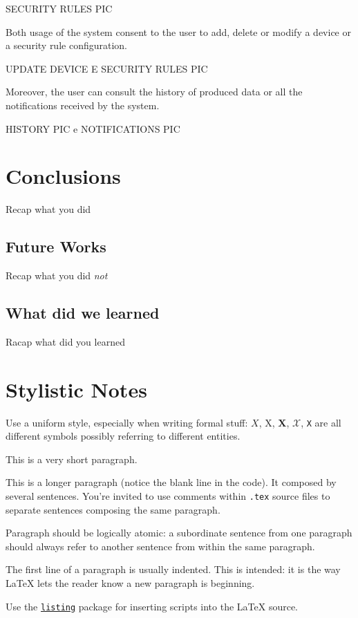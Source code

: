\documentclass{scrartcl}
\begin{document}
    SECURITY RULES PIC

    Both usage of the system consent to the user to add, delete or modify a device or a security rule configuration.

    UPDATE DEVICE E SECURITY RULES PIC

    Moreover, the user can consult the history of produced data or all the notifications received by the system.

    HISTORY PIC e NOTIFICATIONS PIC


    \section{Conclusions}

    Recap what you did

    \subsection{Future Works}

    Recap what you did \emph{not}

    \subsection{What did we learned}

    Racap what did you learned

    \section*{Stylistic Notes}

    Use a uniform style, especially when writing formal stuff: $X$, X, $\mathbf{X}$, $\mathcal{X}$, \texttt{X} are all different symbols possibly referring to different entities.

    This is a very short paragraph.

    This is a longer paragraph (notice the blank line in the code).
    It composed by several sentences.
%
    You're invited to use comments within \texttt{.tex} source files to separate sentences composing the same paragraph.

    Paragraph should be logically atomic: a subordinate sentence from one paragraph should always refer to another sentence from within the same paragraph.

    The first line of a paragraph is usually indented.
%
    This is intended: it is the way \LaTeX{} lets the reader know a new paragraph is beginning.

    Use the \href{https://en.wikibooks.org/wiki/LaTeX/Source_Code_Listings}{\texttt{listing}} package for inserting scripts into the \LaTeX{} source.

    \nocite{*} %
    
    
\end{document}
